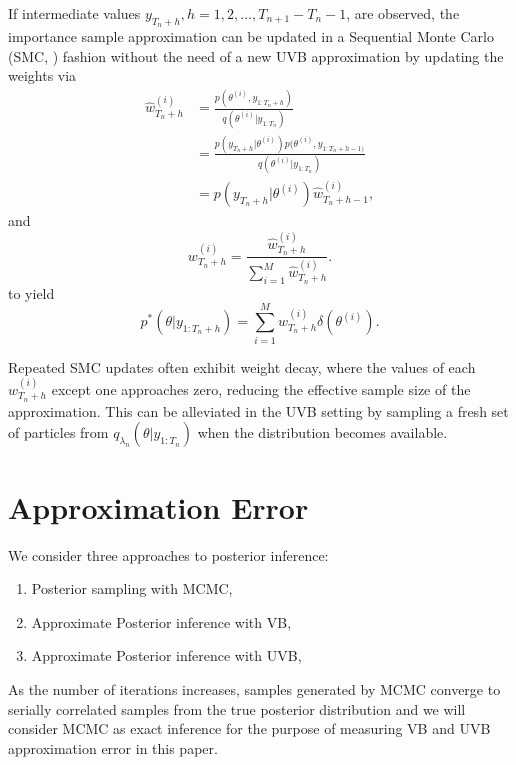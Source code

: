 \documentclass[12pt,a4paper]{article}\usepackage[]{graphicx}\usepackage[]{color}
\begin{document}
If intermediate values $y_{T_n+h}, h = 1, 2, \dots, T_{n+1} - T_{n} - 1$, are observed, the importance sample approximation can be updated in a Sequential Monte Carlo (SMC, \cite{Doucet2000}) fashion without the need of a new UVB approximation by updating the weights via
\begin{align}
\hat{w}^{(i)}_{T_n+h} &= \frac{p(\theta^{(i)}, y_{1:T_n+h})}{q(\theta^{(i)} | y_{1:T_n})} \nonumber \\
&= \frac{p(y_{T_n+h} | \theta^{(i)})p(\theta^{(i)}, y_{1:T_n+h-1)}}{q(\theta^{(i)} | y_{1:T_n})} \nonumber \\
&= p(y_{T_n+h} | \theta^{(i)}) \hat{w}^{(i)}_{T_n+h-1}, \label{IS:UpdateWeights}
\end{align}
and
\begin{equation}
\label{IS:UpdateWeightsNorm}
w^{(i)}_{T_n+h} = \frac{\hat{w}^{(i)}_{T_n+h}}{\sum_{i=1}^M \hat{w}^{(i)}_{T_n+h}}.
\end{equation}
to yield
\begin{equation}
\label{IS:ApproxUpdate}
p^*(\theta | y_{1:T_n+h}) = \sum_{i=1}^M w^{(i)}_{T_n+h} \delta(\theta^{(i)}).
\end{equation}

Repeated SMC updates often exhibit weight decay, where the values of each $w^{(i)}_{T_n+h}$ except one approaches zero, reducing the effective sample size of the approximation. This can be alleviated in the UVB setting by sampling a fresh set of particles from $q_{\lambda_n}(\theta | y_{1:T_n})$ when the distribution becomes available.

\iffalse
\section{Approximation Error}

We consider three approaches to posterior inference:
\begin{enumerate}
\item Posterior sampling with MCMC,
\item Approximate Posterior inference with VB,
\item Approximate Posterior inference with UVB,
\end{enumerate}

As the number of iterations increases, samples generated by MCMC converge to serially correlated samples from the true posterior distribution and we will consider MCMC as exact inference for the purpose of measuring VB and UVB approximation error in this paper.
\\
\end{document}
